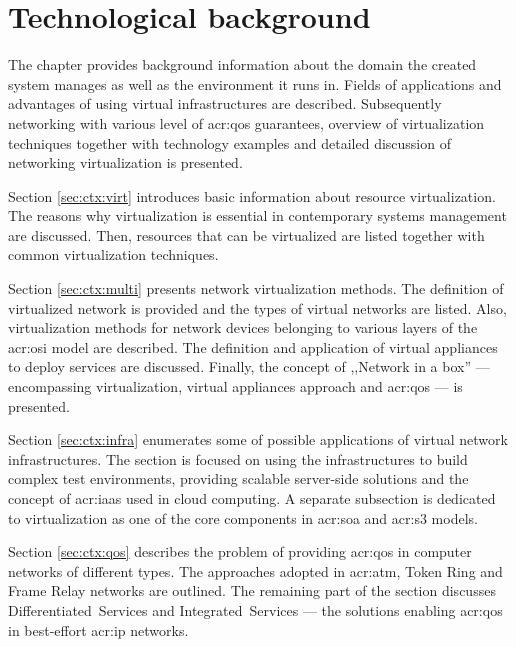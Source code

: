 \documentclass[11pt]{book}
\begin{document}
  \chapter{Technological background}
  \label{chap:bck}

    The chapter provides background information about the domain the created system manages as well as the environment
    it runs in.  Fields of applications and advantages of using virtual infrastructures are described.  Subsequently
    networking with various level of \gls{acr:qos} guarantees, overview of virtualization techniques together with
    technology examples and detailed discussion of networking virtualization is presented.

    Section \ref{sec:ctx:virt} introduces basic information about resource virtualization. The reasons why
    virtualization is essential in contemporary systems management are discussed. Then, resources that can be
    virtualized are listed together with common virtualization techniques.

    Section \ref{sec:ctx:multi} presents network virtualization methods. The definition of virtualized network is
    provided and the types of virtual networks are listed. Also, virtualization methods for network devices belonging to
    various layers of the \gls{acr:osi} model are described. The definition and application of virtual appliances to
    deploy services are discussed. Finally, the concept of ,,Network in a box'' --- encompassing virtualization, virtual
    appliances approach and \gls{acr:qos} --- is presented.

    Section \ref{sec:ctx:infra} enumerates some of possible applications of virtual network infrastructures. The section
    is focused on using the infrastructures to build complex test environments, providing scalable server-side solutions
    and the concept of \gls{acr:iaas} used in cloud computing. A separate subsection is dedicated to virtualization as
    one of the core components in \gls{acr:soa} and \gls{acr:s3} models.

    Section \ref{sec:ctx:qos} describes the problem of providing \gls{acr:qos} in computer networks of different types.
    The approaches adopted in \gls{acr:atm}, Token Ring and Frame Relay networks are outlined. The remaining part of the
    section discusses Differentiated~Services and Integrated~Services --- the solutions enabling \gls{acr:qos} in
    best-effort \gls{acr:ip} networks.

\end{document}
